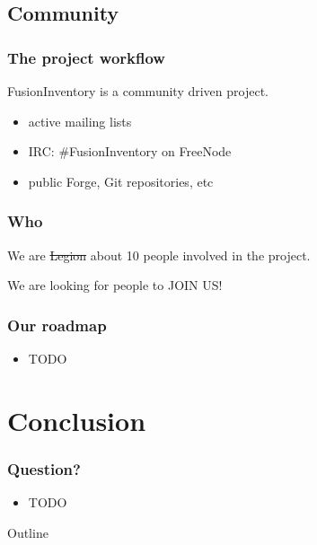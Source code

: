 \documentclass{beamer}
\begin{document}
\subsection{Community}

\begin{frame}
    \frametitle{The project workflow}
    FusionInventory is a community driven project.

    \begin{itemize}
        \item active mailing lists
        \item IRC: \#FusionInventory on FreeNode
        \item public Forge, Git repositories, etc
    \end{itemize}
\end{frame}

\begin{frame}
    \frametitle{Who}

    We are \sout{Legion} about 10 people involved in the project.

    \pause
    We are looking for people to JOIN US!
\end{frame}

\begin{frame}
    \frametitle{Our roadmap}
    \begin{itemize}
        \item TODO
    \end{itemize}
\end{frame}

\section{Conclusion}

%
\begin{frame}
    \frametitle{Question?}
    
    \begin{itemize}
        \item TODO
    \end{itemize}
\end{frame}

\begin{frame}[shrink=20]{Outline}

    \tableofcontents
\end{frame}
\end{document}
